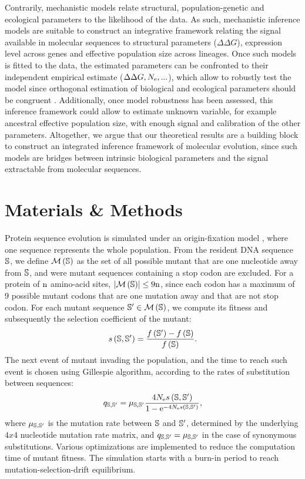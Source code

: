 Contrarily, mechanistic models relate structural, population-genetic and ecological parameters to the likelihood of the data.
As such, mechanistic inference models are suitable to construct an integrative framework relating the signal available in molecular sequences to structural parameters ($\Delta \Delta G$), expression level across genes and effective population size across lineages.
Once such models is fitted to the data, the estimated parameters can be confronted to their independent empirical estimate ($\Delta \Delta G, N_{\mathrm{e}}, ...$), which allow to robustly test the model since orthogonal estimation of biological and ecological parameters should be congruent \cite{Dasmeh2014}. 
Additionally, once model robustness has been assessed, this inference framework could allow to estimate unknown variable, for example ancestral effective population size, with enough signal and calibration of the other parameters. 
Altogether, we argue that our theoretical results are a building block to construct an integrated inference framework of molecular evolution, since such models are bridges between intrinsic biological parameters and the signal extractable from molecular sequences.

\section{Materials \& Methods}
Protein sequence evolution is simulated under an origin-fixation model \citep{McCandlish2014}, where one sequence represents the whole population.
From the resident DNA sequence $\mathbb{S}$, we define $\mathcal{M}\left(\mathbb{S}\right)$ as the set of all possible mutant that are one nucleotide away from $\mathbb{S}$, and were mutant sequences containing a stop codon are excluded.
For a protein of $\text{n}$ amino-acid sites, $\left| \mathcal{M}\left(\mathbb{S}\right) \right| \leq 9 \text{n}$, since each codon has a maximum of $9$ possible mutant codons that are one mutation away and that are not stop codon.
For each mutant sequence $\mathbb{S}' \in \mathcal{M}\left(\mathbb{S}\right)$, we compute its fitness and subsequently the selection coefficient of the mutant:
\begin{equation}
s \left( \mathbb{S},\mathbb{S}'\right) = \dfrac{ f \left(\mathbb{S}' \right) - f \left(\mathbb{S}\right) }{f\left( \mathbb{S}\right)}.
\end{equation}
The next event of mutant invading the population, and the time to reach such event is chosen using Gillespie algorithm, according to the rates of substitution between sequences:
\begin{equation}
q_{\mathbb{S}, \mathbb{S}'} = \mu_{\mathbb{S}, \mathbb{S}'} \dfrac{4 N_{\mathrm{e}} s \left( \mathbb{S},\mathbb{S}'\right)}{1 - \mathrm{e}^{-4 N_{\mathrm{e}} s \left( \mathbb{S},\mathbb{S}'\right)}}, 
\end{equation}
where $\mu_{\mathbb{S}, \mathbb{S}'}$ is the mutation rate between $\mathbb{S}$ and $\mathbb{S}'$, determined by the underlying $4x4$ nucleotide mutation rate matrix, and ${q_{\mathbb{S}, \mathbb{S}'}} = \mu_{\mathbb{S}, \mathbb{S}'}$ in the case of synonymous substitutions.
Various optimizations are implemented to reduce the computation time of mutant fitness.
The simulation starts with a burn-in period to reach mutation-selection-drift equilibrium.

